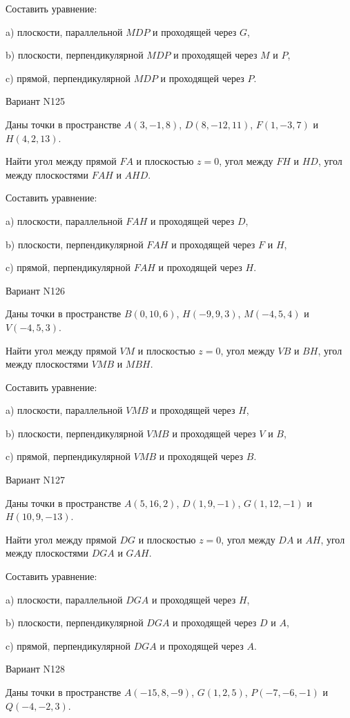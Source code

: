 \documentclass[11pt]{report}
\begin{document}
Составить уравнение: 

a) плоскости, параллельной $MDP$ и проходящей через $G$,

b) плоскости, перпендикулярной $MDP$ и проходящей через $M$ и $P$,

c) прямой, перпендикулярной $MDP$ и проходящей через $P$.

Вариант N125

Даны точки в пространстве
$A(3, -1, 8)$, $D(8, -12, 11)$, $F(1, -3, 7)$ и
$H(4, 2, 13)$.

Найти угол между прямой $FA$ и плоскостью $z = 0$, угол между $FH$ и $HD$, угол между плоскостями $FAH$ 
и $AHD$.

Составить уравнение: 

a) плоскости, параллельной $FAH$ и проходящей через $D$,

b) плоскости, перпендикулярной $FAH$ и проходящей через $F$ и $H$,

c) прямой, перпендикулярной $FAH$ и проходящей через $H$.

Вариант N126

Даны точки в пространстве
$B(0, 10, 6)$, $H(-9, 9, 3)$, $M(-4, 5, 4)$ и
$V(-4, 5, 3)$.

Найти угол между прямой $VM$ и плоскостью $z = 0$, угол между $VB$ и $BH$, угол между плоскостями $VMB$ 
и $MBH$.

Составить уравнение: 

a) плоскости, параллельной $VMB$ и проходящей через $H$,

b) плоскости, перпендикулярной $VMB$ и проходящей через $V$ и $B$,

c) прямой, перпендикулярной $VMB$ и проходящей через $B$.

Вариант N127

Даны точки в пространстве
$A(5, 16, 2)$, $D(1, 9, -1)$, $G(1, 12, -1)$ и
$H(10, 9, -13)$.

Найти угол между прямой $DG$ и плоскостью $z = 0$, угол между $DA$ и $AH$, угол между плоскостями $DGA$ 
и $GAH$.

Составить уравнение: 

a) плоскости, параллельной $DGA$ и проходящей через $H$,

b) плоскости, перпендикулярной $DGA$ и проходящей через $D$ и $A$,

c) прямой, перпендикулярной $DGA$ и проходящей через $A$.

Вариант N128

Даны точки в пространстве
$A(-15, 8, -9)$, $G(1, 2, 5)$, $P(-7, -6, -1)$ и
$Q(-4, -2, 3)$.
\end{document}
